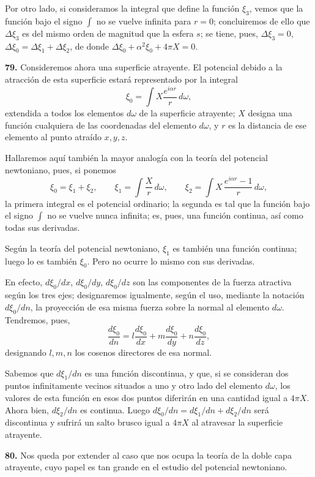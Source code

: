 Por otro lado, si consideramos la integral que define la función $\xi_3$,
vemos que la función bajo el signo $\int$ no se vuelve infinita para
$r=0$; concluiremos de ello que $\Delta\xi_3$ es del mismo orden de
magnitud que la esfera $s$; se tiene, pues, $\Delta\xi_3=0$,
$\Delta\xi_0=\Delta\xi_1+\Delta\xi_2$, de donde
$\Delta\xi_0+\alpha^2\xi_0+4\pi X=0$.

\noindent\textbf{79.} Consideremos ahora una superficie atrayente. El
potencial debido a la atracción de esta superficie estará representado
por la integral
\begin{equation}
\xi_0 = \int X\frac{e^{i\alpha r}}{r}\,d\omega,
\tag{7}
\end{equation}
extendida a todos los elementos $d\omega$ de la superficie atrayente; $X$
designa una función cualquiera de las coordenadas del elemento $d\omega$,
y $r$ es la distancia de ese elemento al punto atraído $x,y,z$.

Hallaremos aquí también la mayor analogía con la teoría del potencial
newtoniano, pues, si ponemos
\[
\xi_0=\xi_1+\xi_2,\qquad
\xi_1=\int \frac{X}{r}\,d\omega,\qquad
\xi_2=\int X\,\frac{e^{i\alpha r}-1}{r}\,d\omega,
\]
la primera integral es el potencial ordinario; la segunda es tal que la
función bajo el signo $\int$ no se vuelve nunca infinita; es, pues, una
función continua, así como todas sus derivadas.

Según la teoría del potencial newtoniano, $\xi_1$ es también una función
continua; luego lo es también $\xi_0$. Pero no ocurre lo mismo con sus
derivadas.

En efecto, $d\xi_0/dx$, $d\xi_0/dy$, $d\xi_0/dz$ son las componentes de la
fuerza atractiva según los tres ejes; designaremos igualmente, según el
uso, mediante la notación $d\xi_0/dn$, la proyección de esa misma fuerza
sobre la normal al elemento $d\omega$. Tendremos, pues,
\[
\frac{d\xi_0}{dn} = l\frac{d\xi_0}{dx}+m\frac{d\xi_0}{dy}+n\frac{d\xi_0}{dz},
\]
designando $l,m,n$ los cosenos directores de esa normal.

Sabemos que $d\xi_1/dn$ es una función discontinua, y que, si se consideran
dos puntos infinitamente vecinos situados a uno y otro lado del elemento
$d\omega$, los valores de esta función en esos dos puntos diferirán en
una cantidad igual a $4\pi X$. Ahora bien, $d\xi_2/dn$ es continua.
Luego $d\xi_0/dn=d\xi_1/dn+d\xi_2/dn$ será discontinua y sufrirá un salto
brusco igual a $4\pi X$ al atravesar la superficie atrayente.

\noindent\textbf{80.} Nos queda por extender al caso que nos ocupa la
teoría de la doble capa atrayente, cuyo papel es tan grande en el estudio
del potencial newtoniano.

